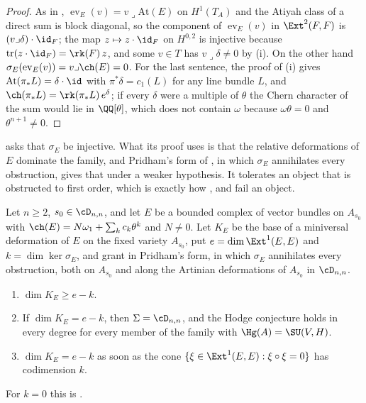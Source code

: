 \begin{proof}
As in , $\operatorname{ev}_{E}(v)=v\lrcorner\mathrm{At}(E)$
on $H^{1}(T_{A})$ and the Atiyah class of a direct sum is block diagonal, so
the component of $\operatorname{ev}_{E}(v)$ in $\Ext^{2}(F,F)$ is
$(v\lrcorner\delta)\cdot\id_{F}$; the map $z\mapsto z\cdot\id_{F}$ on
$H^{0,2}$ is injective because $\mathrm{tr}(z\cdot\id_{F})=\rk(F)\,z$, and
some $v\in T$ has $v\lrcorner\delta\ne0$ by (i). On the
other hand $\sigma_{E}(\operatorname{ev}_{E}(v))=v\lrcorner\ch(E)=0$. For the
last sentence, the proof of (i) gives
$\mathrm{At}(\pi_{*}L)=\delta\cdot\id$ with $\pi^{*}\delta=c_{1}(L)$ for any
line bundle $L$, and $\ch(\pi_{*}L)=\rk(\pi_{*}L)\,e^{\delta}$; if every
$\delta$ were a multiple of $\theta$ the Chern character of the sum would lie
in $\QQ[\theta]$, which does not contain $\omega$ because $\omega\theta=0$ and
$\theta^{n+1}\ne0$.
\end{proof}

 asks that $\sigma_{E}$ be injective. What its proof
uses is that the relative deformations of $E$ dominate the family, and
Pridham's form of , in which $\sigma_{E}$ annihilates every
obstruction, gives that under a weaker hypothesis. It tolerates an object that
is obstructed to first order, which is exactly how ,
 and  fail an object.

\begin{proposition}\label{prop:p2flat}
Let $n\ge2$, $s_{0}\in\cD_{n,n}$, and let $E$ be a bounded complex of vector
bundles on $A_{s_{0}}$ with $\ch(E)=N\omega_{1}+\sum_{k}c_{k}\theta^{k}$ and
$N\ne0$. Let $K_{E}$ be the base of a miniversal deformation of $E$ on the
fixed variety $A_{s_{0}}$, put $e=\dim\Ext^{1}(E,E)$ and
$k=\dim\ker\sigma_{E}$, and grant  in Pridham's form, in which
$\sigma_{E}$ annihilates every obstruction, both on $A_{s_{0}}$ and along the
Artinian deformations of $A_{s_{0}}$ in $\cD_{n,n}$.
\begin{enumerate}[label=\textup{(\roman*)},leftmargin=2.6em,itemsep=2pt]
\item $\dim K_{E}\ge e-k$.
\item If $\dim K_{E}=e-k$, then $\Sigma=\cD_{n,n}$, and the Hodge conjecture
  holds in every degree for every member of the family with
  $\Hg(A)=\SU(V,H)$.
\item $\dim K_{E}=e-k$ as soon as the cone
  $\{\xi\in\Ext^{1}(E,E):\xi\circ\xi=0\}$ has codimension $k$.
\end{enumerate}
For $k=0$ this is .
\end{proposition}

